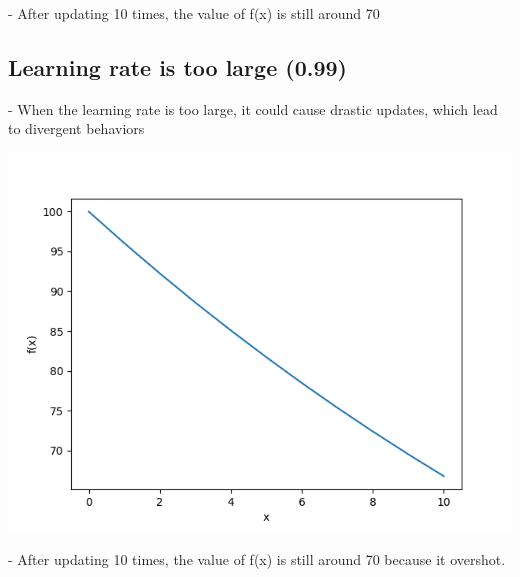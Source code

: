 \documentclass{article}
\begin{document}
- After updating 10 times, the value of f(x) is still around 70

\subsection{Learning rate is too large (0.99)}
- When the learning rate is too large, it could cause drastic updates, which lead to divergent behaviors

\begin{center}
    \includegraphics[width=0.5\linewidth]{image3.png}
\end{center}

- After updating 10 times, the value of f(x) is still around 70 because it overshot.
\end{document}
